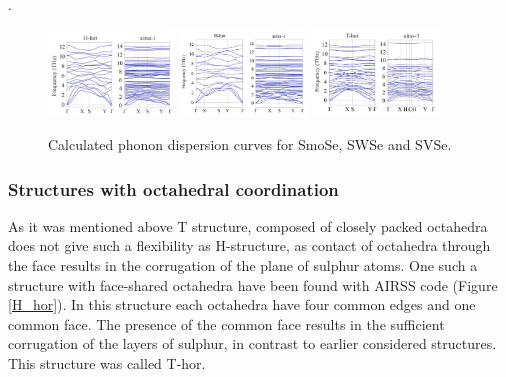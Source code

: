 .\documentclass[a4paperm]{article}
\begin{document}
\begin{figure}[H]
	\includegraphics[width=0.3\textwidth]{smose_phon.png}
	\includegraphics[width=0.3\textwidth]{swse_phon.png}
	\includegraphics[width=0.3\textwidth]{svse_phon.png}
        \caption{Calculated phonon dispersion curves for SmoSe, SWSe and SVSe.}
\label{phon}
\end{figure}

\subsubsection{Structures with octahedral coordination}

As it was mentioned above T structure, composed of closely packed octahedra does not give such a flexibility as H-structure, as contact of octahedra through the face results in the corrugation of the plane of sulphur atoms. 
One such a structure with face-shared octahedra have been found with AIRSS code (Figure \ref{H_hor}).
In this structure each octahedra have four common edges and one common face.
The presence of the common face results in the sufficient corrugation of the layers of sulphur, in contrast to earlier considered structures.
This structure was called T-hor.
\end{document}
